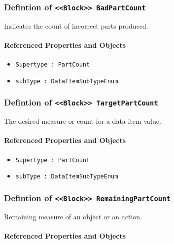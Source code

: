 \subsubsection{Defintion of \texttt{<<Block>> BadPartCount}}
  \label{type:BadPartCount}

\FloatBarrier

Indicates the count of incorrect parts produced.

\FloatBarrier
\paragraph{Referenced Properties and Objects}

\begin{itemize}
\item \texttt{Supertype : PartCount}

\item \texttt{subType : DataItemSubTypeEnum}

\end{itemize}
\FloatBarrier
\subsubsection{Defintion of \texttt{<<Block>> TargetPartCount}}
  \label{type:TargetPartCount}

\FloatBarrier

The desired measure or count for a data item value.

\FloatBarrier
\paragraph{Referenced Properties and Objects}

\begin{itemize}
\item \texttt{Supertype : PartCount}

\item \texttt{subType : DataItemSubTypeEnum}

\end{itemize}
\FloatBarrier
\subsubsection{Defintion of \texttt{<<Block>> RemainingPartCount}}
  \label{type:RemainingPartCount}

\FloatBarrier

Remaining measure of an object or an action.

\FloatBarrier
\paragraph{Referenced Properties and Objects}

